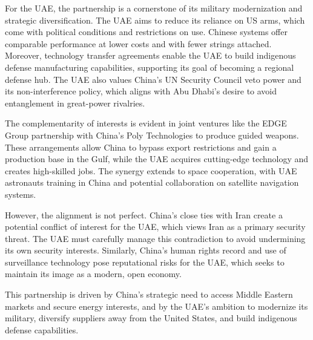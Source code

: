 \documentclass[10pt,a4paper]{article}
\begin{document}
{\small For the UAE, the partnership is a cornerstone of its military modernization and strategic diversification. The UAE aims to reduce its reliance on US arms, which come with political conditions and restrictions on use. Chinese systems offer comparable performance at lower costs and with fewer strings attached. Moreover, technology transfer agreements enable the UAE to build indigenous defense manufacturing capabilities, supporting its goal of becoming a regional defense hub. The UAE also values China's UN Security Council veto power and its non-interference policy, which aligns with Abu Dhabi's desire to avoid entanglement in great-power rivalries.}\par
{\small The complementarity of interests is evident in joint ventures like the EDGE Group partnership with China's Poly Technologies to produce guided weapons. These arrangements allow China to bypass export restrictions and gain a production base in the Gulf, while the UAE acquires cutting-edge technology and creates high-skilled jobs. The synergy extends to space cooperation, with UAE astronauts training in China and potential collaboration on satellite navigation systems.}\par
{\small However, the alignment is not perfect. China's close ties with Iran create a potential conflict of interest for the UAE, which views Iran as a primary security threat. The UAE must carefully manage this contradiction to avoid undermining its own security interests. Similarly, China's human rights record and use of surveillance technology pose reputational risks for the UAE, which seeks to maintain its image as a modern, open economy.}\par
{\small This partnership is driven by China's strategic need to access Middle Eastern markets and secure energy interests, and by the UAE's ambition to modernize its military, diversify suppliers away from the United States, and build indigenous defense capabilities.}\par
\label{chap:1:end}
\end{document}
